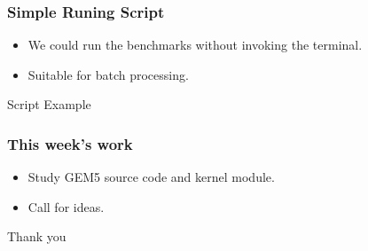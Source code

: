 \documentclass{beamer}
\begin{document}
\begin{frame}
    \frametitle{Simple Runing Script}
    \begin{itemize}
	\item We could run the benchmarks without invoking the terminal. 
	\item Suitable for batch processing.
    \end{itemize}
    \begin{block}{Script Example}
	
    \end{block}
\end{frame}
\begin{frame}
    \frametitle{This week's work}
    \begin{itemize}
	\item Study GEM5 source code and kernel module.
	\item Call for ideas.
    \end{itemize}
\end{frame}
\begin{frame}
\Huge{\centerline{Thank you}}
\end{frame}
\end{document}

